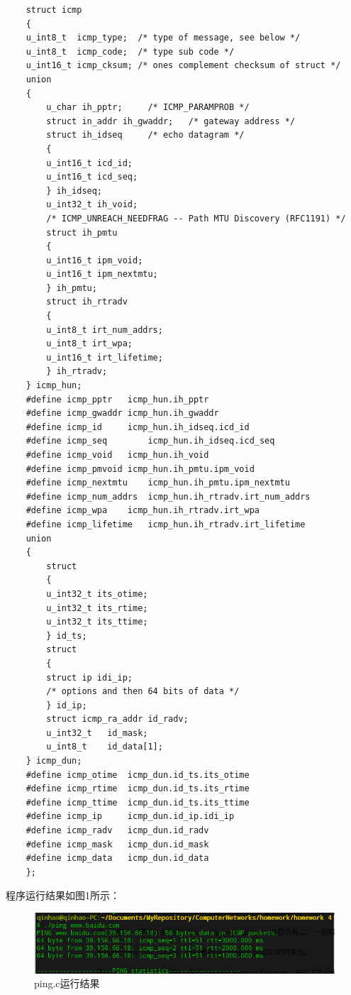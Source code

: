 \documentclass[a4paper,UTF8]{article}
\begin{document}
\begin{lstlisting}
    struct icmp
    {
    u_int8_t  icmp_type;  /* type of message, see below */
    u_int8_t  icmp_code;  /* type sub code */
    u_int16_t icmp_cksum; /* ones complement checksum of struct */
    union
    {
        u_char ih_pptr;     /* ICMP_PARAMPROB */
        struct in_addr ih_gwaddr;   /* gateway address */
        struct ih_idseq     /* echo datagram */
        {
        u_int16_t icd_id;
        u_int16_t icd_seq;
        } ih_idseq;
        u_int32_t ih_void;
        /* ICMP_UNREACH_NEEDFRAG -- Path MTU Discovery (RFC1191) */
        struct ih_pmtu
        {
        u_int16_t ipm_void;
        u_int16_t ipm_nextmtu;
        } ih_pmtu;
        struct ih_rtradv
        {
        u_int8_t irt_num_addrs;
        u_int8_t irt_wpa;
        u_int16_t irt_lifetime;
        } ih_rtradv;
    } icmp_hun;
    #define icmp_pptr   icmp_hun.ih_pptr
    #define icmp_gwaddr icmp_hun.ih_gwaddr
    #define icmp_id     icmp_hun.ih_idseq.icd_id
    #define icmp_seq        icmp_hun.ih_idseq.icd_seq
    #define icmp_void   icmp_hun.ih_void
    #define icmp_pmvoid icmp_hun.ih_pmtu.ipm_void
    #define icmp_nextmtu    icmp_hun.ih_pmtu.ipm_nextmtu
    #define icmp_num_addrs  icmp_hun.ih_rtradv.irt_num_addrs
    #define icmp_wpa    icmp_hun.ih_rtradv.irt_wpa
    #define icmp_lifetime   icmp_hun.ih_rtradv.irt_lifetime
    union
    {
        struct
        {
        u_int32_t its_otime;
        u_int32_t its_rtime;
        u_int32_t its_ttime;
        } id_ts;
        struct
        {
        struct ip idi_ip;
        /* options and then 64 bits of data */
        } id_ip;
        struct icmp_ra_addr id_radv;
        u_int32_t   id_mask;
        u_int8_t    id_data[1];
    } icmp_dun;
    #define icmp_otime  icmp_dun.id_ts.its_otime
    #define icmp_rtime  icmp_dun.id_ts.its_rtime
    #define icmp_ttime  icmp_dun.id_ts.its_ttime
    #define icmp_ip     icmp_dun.id_ip.idi_ip
    #define icmp_radv   icmp_dun.id_radv
    #define icmp_mask   icmp_dun.id_mask
    #define icmp_data   icmp_dun.id_data
    };
\end{lstlisting}
程序运行结果如图1所示：
\begin{figure}[h]
    \centering
    \includegraphics[width=1\textwidth]{ping.png}
    \caption{ping.c运行结果}
    \label{pingImg}
\end{figure}
\end{document}
